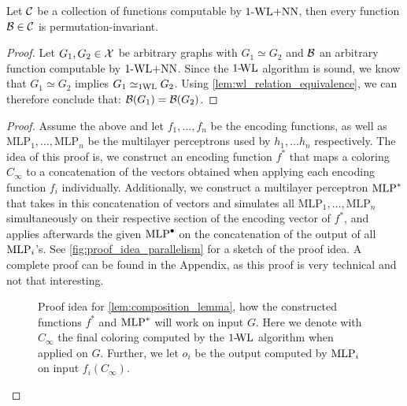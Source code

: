 \begin{lemma}\label{lem:wlnn_permutation_invariance}
    Let $\mathcal{C}$ be a collection of functions computable by $\text{1-WL+NN}$, then every function $\mathcal{B} \in \mathcal{C}$ is permutation-invariant.
\end{lemma}

\begin{proof}
    Let $G_1, G_2 \in \mathcal{X}$ be arbitrary graphs with $G_1 \simeq G_2$ and $\mathcal{B}$ an arbitrary function computable by $\text{1-WL+NN}$. Since the $\text{1-\!WL}$ algorithm is sound, we know that $G_1 \simeq G_2$ implies $G_1 \simeq_{\text{1WL}} G_2$. Using \cref{lem:wl_relation_equivalence}, we can therefore conclude that: $\mathcal{B}(G_1) = \mathcal{B}(G_2)$.
\end{proof}

\begin{proof}
    Assume the above and let $f_{1}, \ldots, f_{n}$ be the encoding functions, as well as $\text{MLP}_1, \ldots, \text{MLP}_n$ be the multilayer perceptrons used by $h_1, \dots h_n$ respectively. The idea of this proof is, we construct an encoding function $f^*$ that maps a coloring $C_\infty$ to a concatenation of the vectors obtained when applying each encoding function $f_i$ individually. Additionally, we construct a multilayer perceptron $\text{MLP}^*$ that takes in this concatenation of vectors and simulates all $\text{MLP}_1, \ldots, \text{MLP}_n$ simultaneously on their respective section of the encoding vector of $f^*$, and applies afterwards the given $\text{MLP}^\bullet$ on the concatenation of the output of all $\text{MLP}_i$'s.  See \autoref{fig:proof_idea_parallelism} for a sketch of the proof idea. A complete proof can be found in the Appendix, as this proof is very technical and not that interesting.

    \begin{figure}[H]
        \centering
        
        \caption{Proof idea for \cref{lem:composition_lemma}, how the constructed functions $f^*$ and $\text{MLP}^*$ will work on input $G$. Here we denote with $C_\infty$ the final coloring computed by the $\text{1-\!WL}$ algorithm when applied on $G$. Further, we let $o_i$ be the output computed by $\text{MLP}_i$ on input $f_i(C_\infty)$.}
        \label{fig:proof_idea_parallelism}
    \end{figure}
\end{proof}
    



